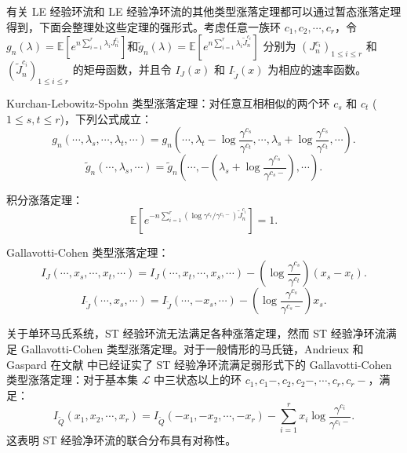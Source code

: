 有关 LE 经验环流和 LE 经验净环流的其他类型涨落定理都可以通过暂态涨落定理得到，下面会整理处这些定理的强形式。考虑任意一族环 $c_1,c_2,\cdots,c_r$，令  $g_n(\lambda) = \mathbb{E}[e^{n\sum_{i=1}^r\lambda_iJ^{c_i}_n}]$和$\tilde{g}_n(\lambda) = \mathbb{E}[e^{n\sum_{i=1}^{r}\lambda_i\tilde{J}^{c_i}_n}]$ 分别为 $(J^{c_i}_n)_{1\le i\le r}$ 和 $(\tilde{J}^{c_i}_n)_{1\le i\le r}$ 的矩母函数，并且令 $I_{J}(x)$ 和 $I_{\tilde{J}}(x)$ 为相应的速率函数。

Kurchan-Lebowitz-Spohn 类型涨落定理：对任意互相相似的两个环 $c_s$ 和 $c_t$ ($1\le s,t\le r$)，下列公式成立：
\begin{equation*}
	g_n(\cdots,\lambda_s,\cdots,\lambda_t,\cdots) = g_n\left(\cdots,\lambda_t-\log\frac{\gamma^{c_s}}{\gamma^{c_t}},\cdots,\lambda_s+\log\frac{\gamma^{c_s}}{\gamma^{c_t}},\cdots\right).
\end{equation*}
\begin{equation*}
	\tilde{g}_n(\cdots,\lambda_s,\cdots)=\tilde{g}_n\left(\cdots,-\left(\lambda_s+\log\frac{\gamma^{c_s}}{\gamma^{c_s-}}\right),\cdots\right).
\end{equation*}

积分涨落定理： 
\begin{equation*}
	\mathbb{E}\left[e^{-n\sum_{i=1}^r(\log \gamma^{c_i}/\gamma^{c_i-})\tilde{J}^{c_i}_n}\right]=1.
\end{equation*}

Gallavotti-Cohen 类型涨落定理：
\begin{equation*}
	I_J(\cdots,x_s,\cdots,x_t,\cdots)=I_J(\cdots,x_t,\cdots,x_s,\cdots)-\left(\log\frac{\gamma^{c_s}}{\gamma^{c_t}}\right)(x_s-x_t).
\end{equation*}
\begin{equation*}
	I_{\tilde{J}}(\cdots,x_s,\cdots) = I_{\tilde{J}}(\cdots,-x_s,\cdots)-\left(\log\frac{\gamma^{c_s}}{\gamma^{c_s-}}\right)x_s.
\end{equation*}


关于单环马氏系统，ST 经验环流无法满足各种涨落定理，然而 ST 经验净环流满足 Gallavotti-Cohen 类型涨落定理。对于一般情形的马氏链，Andrieux 和 Gaspard 在文献 \cite{andrieux2007fluctuation} 中已经证实了 ST 经验净环流满足弱形式下的 Gallavotti-Cohen 类型涨落定理：对于基本集 $\mathcal{L}$ 中三状态以上的环  $c_1,c_1-,c_2,c_2-,\cdots,c_r,c_r-$，满足：
\begin{equation*}
I_{\tilde{Q}}(x_1,x_2,\cdots,x_r)
= I_{\tilde{Q}}(-x_1,-x_2,\cdots,-x_r)
-\sum_{i=1}^rx_i\log\frac{\gamma^{c_i}}{\gamma^{c_i-}}.
\end{equation*}
这表明 ST 经验净环流的联合分布具有对称性。

